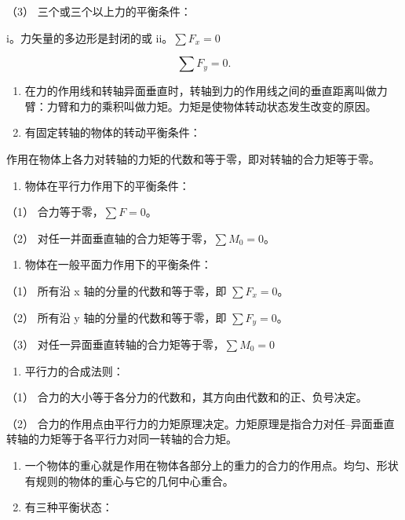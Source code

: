 （3） 三个或三个以上力的平衡条件：

i。力矢量的多边形是封闭的或 ii。\(\sum F_{x} = 0\)

\[
\sum F _ {y} = 0.
\]

\begin{enumerate}
\def\labelenumi{\arabic{enumi}.}
\setcounter{enumi}{1}
\item
  在力的作用线和转轴异面垂直时，转轴到力的作用线之间的垂直距离叫做力臂：力臂和力的乘积叫做力矩。力矩是使物体转动状态发生改变的原因。
\item
  有固定转轴的物体的转动平衡条件：
\end{enumerate}

作用在物体上各力对转轴的力矩的代数和等于零，即对转轴的合力矩等于零。

\begin{enumerate}
\def\labelenumi{\arabic{enumi}.}
\setcounter{enumi}{3}
\tightlist
\item
  物体在平行力作用下的平衡条件：
\end{enumerate}

（1） 合力等于零，\(\sum F = 0\)。

（2） 对任一并面垂直轴的合力矩等于零，\(\sum M_{0}=0\)。

\begin{enumerate}
\def\labelenumi{\arabic{enumi}.}
\setcounter{enumi}{4}
\tightlist
\item
  物体在一般平面力作用下的平衡条件：
\end{enumerate}

（1） 所有沿 x 轴的分量的代数和等于零，即 \(\sum F_{x}=0\)。

（2） 所有沿 y 轴的分量的代数和等于零，即 \(\sum F_{y}=0\)。

（3） 对任一异面垂直转轴的合力矩等于零，\(\sum M_{0}=0\)

\begin{enumerate}
\def\labelenumi{\arabic{enumi}.}
\setcounter{enumi}{5}
\tightlist
\item
  平行力的合成法则：
\end{enumerate}

（1） 合力的大小等于各分力的代数和，其方向由代数和的正、负号决定。

（2）
合力的作用点由平行力的力矩原理决定。力矩原理是指合力对任--异面垂直转轴的力矩等于各平行力对同一转轴的合力矩。

\begin{enumerate}
\def\labelenumi{\arabic{enumi}.}
\setcounter{enumi}{6}
\item
  一个物体的重心就是作用在物体各部分上的重力的合力的作用点。均匀、形状有规则的物体的重心与它的几何中心重合。
\item
  有三种平衡状态：
\end{enumerate}

